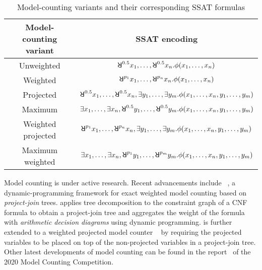 \begin{table}[t]
    \centering
    \caption{Model-counting variants and their corresponding SSAT formulas}
    \label{tbl:related-work-model-counting}
    \begin{tabular}{c|c}
        Model-counting variant & SSAT encoding                                                                                              \\
        \hline
        Unweighted             & $\random{0.5}x_1,\ldots,\random{0.5}x_n.\pf(x_1,\ldots,x_n)$                                               \\
        Weighted               & $\random{p_1}x_1,\ldots,\random{p_n}x_n.\pf(x_1,\ldots,x_n)$                                               \\
        Projected              & $\random{0.5}x_1,\ldots,\random{0.5}x_n,\exists y_1,\ldots,\exists y_m.\pf(x_1,\ldots,x_n,y_1,\ldots,y_m)$ \\
        Maximum                & $\exists x_1,\ldots,\exists x_n,\random{0.5}y_1,\ldots,\random{0.5}y_m.\pf(x_1,\ldots,x_n,y_1,\ldots,y_m)$ \\
        Weighted projected     & $\random{p_1}x_1,\ldots,\random{p_n}x_n,\exists y_1,\ldots,\exists y_m.\pf(x_1,\ldots,x_n,y_1,\ldots,y_m)$ \\
        Maximum weighted       & $\exists x_1,\ldots,\exists x_n,\random{p_1}y_1,\ldots,\random{p_m}y_m.\pf(x_1,\ldots,x_n,y_1,\ldots,y_m)$ \\
    \end{tabular}
\end{table}

Model counting is under active research.
Recent advancements include \dpmc~\cite{Dudek2020},
a dynamic-programming framework for exact weighted model counting based on \textit{project-join} trees.
\dpmc applies tree decomposition to the constraint graph of a CNF formula to obtain a project-join tree
and aggregates the weight of the formula with \textit{arithmetic decision diagrams} using dynamic programming.
\dpmc is further extended to a weighted projected model counter \procount~\cite{Dudek2021}
by requiring the projected variables to be placed on top of the non-projected variables in a project-join tree.
Other latest developments of model counting can be found in the report~\cite{MC-COMP2020} of the 2020 Model Counting Competition.